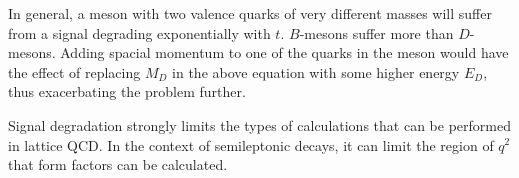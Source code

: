 In general, a meson with two valence quarks of very different masses will suffer from a signal degrading exponentially with $t$. $B$-mesons suffer more than $D$-mesons. Adding spacial momentum to one of the quarks in the meson would have the effect of replacing $M_D$ in the above equation with some higher energy $E_D$, thus exacerbating the problem further.

Signal degradation strongly limits the types of calculations that can be performed in lattice QCD. In the context of semileptonic decays, it can limit the region of $q^2$ that form factors can be calculated.




